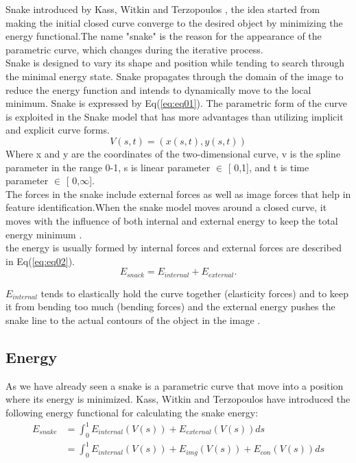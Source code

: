 \hspace{-0.6cm}Snake introduced by Kass, Witkin and Terzopoulos \cite{2.1}, the idea started from
making the initial closed curve converge to the desired object by minimizing
the energy functional.The name "snake" is the reason for the appearance of
the parametric curve, which changes during the iterative process.\\
Snake is designed to vary its shape and position while tending to search
through the minimal energy state. Snake propagates through the domain of the
image to reduce the energy function and intends to dynamically move to the
local minimum. Snake is expressed by Eq(\ref{eq:eq01}). The parametric form of the curve
is exploited in the Snake model that has more advantages than utilizing implicit
and explicit curve forms.\\
\begin{equation}
        V(s, t) = (x (s, t), y (s, t))\label{eq:eq01}
\end{equation}
Where x and y are the coordinates of the two-dimensional curve, v is the spline parameter
in the range 0-1, s is linear parameter $\in$ [ 0,1], and t is time parameter $\in$ [ 0,$\infty$].\\
The forces in the snake include external forces as well as image forces that help in feature identification.When
the snake model moves around a closed curve, it moves with the influence of both internal and external energy
to keep the total energy minimum \cite{2.2}.\\
the energy is usually formed by internal forces and external forces are described in Eq(\ref{eq:eq02}).
\begin{equation}
        E_{snack} = E_{internal} + E_{external}.\label{eq:eq02}
\end{equation}

\hspace{-0.6cm}$E_{internal}$ tends to elastically hold the curve together (elasticity forces) and
to keep it  from bending too much (bending forces) and the external energy  pushes the snake line 
to the actual contours of the object in the image \cite{2.3}.

\subsection{Energy}\label{subsec:energy}
As we have already seen a snake is a parametric curve that move into a position where its energy is minimized.
Kass, Witkin and Terzopoulos \cite{2.1} have introduced the following energy functional for calculating the snake energy:
\begin{equation}
        \begin{aligned}
                E_{snake} & = \int_{0}^{1} E_{internal}(V(s)) + E_{external}(V(s)) ds \\
                          & = \int_{0}^{1} E_{internal}(V(s)) + E_{img}(V(s)) + E_{con}(V(s)) ds
        \end{aligned}
        \label{eq:eq03}
\end{equation}



